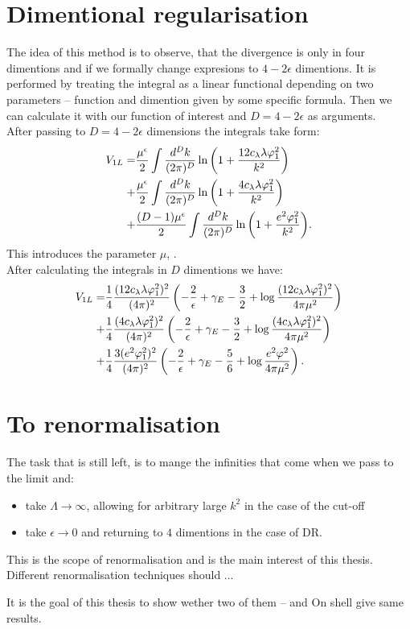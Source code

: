 \section{Dimentional regularisation}
The idea of this method is to observe, that the divergence is only in four dimentions 
and if we formally change expresions to $4-2\epsilon$ dimentions. 
It is performed by treating the integral as a linear functional depending on two parameters --
function and dimention given by some specific formula. Then we can calculate it with our 
function of interest and $D = 4-2\epsilon$ as arguments.  \\
After passing to $D=4-2\epsilon$ dimensions the integrals take form: 
\begin{align}
V_{1L}=&\frac{\mu^\epsilon}{2} \int\frac{d^Dk}{(2\pi)^D}\ln{\left(1+\frac{12c_\lambda\lambda\varphi_1^2}{k^2}
\right)}\\
+&\frac{\mu^\epsilon}{2} \int\frac{d^Dk}{(2\pi)^D}\ln{\left(1+\frac{4c_\lambda\lambda\varphi_1^2}{k^2}
\right)} \\ 
+&\frac{(D-1)\mu^\epsilon}{2} \int\frac{d^Dk}{(2\pi)^D}\ln{\left(1+\frac{e^2\varphi_1^2}{k^2}\right)}.
\end{align}
This introduces the parameter $\mu$, . \\
After calculating the integrals in $D$ dimentions we have:
\begin{align}
V_{1L}=&\frac{1}{4}\frac{(12c_\lambda\lambda\varphi_1^2)^2}{(4\pi)^2}\left(-\frac{2}{\epsilon}
+\gamma_E-\frac{3}{2}+\log{\frac{(12c_\lambda\lambda\varphi_1^2)^2}{4\pi\mu^2}}\right)  \\
+&\frac{1}{4}\frac{(4c_\lambda\lambda\varphi_1^2)^2}{(4\pi)^2}\left(-\frac{2}{\epsilon}
+\gamma_E-\frac{3}{2}+\log{\frac{(4c_\lambda\lambda\varphi_1^2)^2}{4\pi\mu^2}}\right)  \\
+&\frac{1}{4}\frac{3(e^2\varphi_1^2)^2}{(4\pi)^2}\left(-\frac{2}{\epsilon}+\gamma_E
-\frac{5}{6}+\log{\frac{e^2\varphi^2}{4\pi\mu^2}}\right).
\end{align}
\section{To renormalisation}
The task that is still left, is to mange the infinities that come when we pass to the limit 
and:
\begin{itemize} 
\item take $\Lambda \to \infty$, allowing for arbitrary large $k^2$ in the case of the cut-off
\item take $\epsilon \to 0$ and returning to $4$ dimentions in the case of DR.

\end{itemize}
This is the scope of renormalisation and is the main interest of this thesis. 
Different renormalisation techniques should ... 

It is the goal of this thesis to show wether two of them -- \MSbar and On shell give same results.











